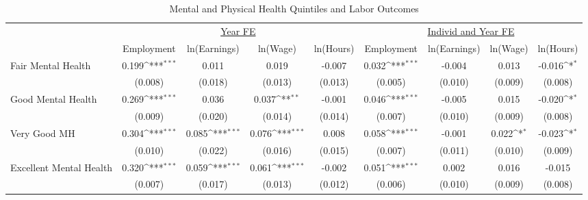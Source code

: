 \def\sym#1{\ifmmode^{#1}\else\(^{#1}\)\fi}
\begin{table}
\center\caption*{Mental and Physical Health Quintiles and Labor Outcomes}
\footnotesize
\begin{tabular}{l*{8}{c}}
                    &\multicolumn{4}{c}{\underline{Year FE}}                                                &\multicolumn{4}{c}{\underline{Individ and Year FE}}                                    \\\cmidrule(lr){2-5}\cmidrule(lr){6-9}
                    &\multicolumn{1}{c}{Employment}&\multicolumn{1}{c}{ln(Earnings)}&\multicolumn{1}{c}{ln(Wage)}&\multicolumn{1}{c}{ln(Hours)}&\multicolumn{1}{c}{Employment}&\multicolumn{1}{c}{ln(Earnings)}&\multicolumn{1}{c}{ln(Wage)}&\multicolumn{1}{c}{ln(Hours)}\\
\midrule
Fair Mental Health  &       0.199\sym{***}&       0.011         &       0.019         &      -0.007         &       0.032\sym{***}&      -0.004         &       0.013         &      -0.016\sym{*}  \\
                    &     (0.008)         &     (0.018)         &     (0.013)         &     (0.013)         &     (0.005)         &     (0.010)         &     (0.009)         &     (0.008)         \\
Good Mental Health  &       0.269\sym{***}&       0.036         &       0.037\sym{**} &      -0.001         &       0.046\sym{***}&      -0.005         &       0.015         &      -0.020\sym{*}  \\
                    &     (0.009)         &     (0.020)         &     (0.014)         &     (0.014)         &     (0.007)         &     (0.010)         &     (0.009)         &     (0.008)         \\
Very Good MH        &       0.304\sym{***}&       0.085\sym{***}&       0.076\sym{***}&       0.008         &       0.058\sym{***}&      -0.001         &       0.022\sym{*}  &      -0.023\sym{*}  \\
                    &     (0.010)         &     (0.022)         &     (0.016)         &     (0.015)         &     (0.007)         &     (0.011)         &     (0.010)         &     (0.009)         \\
Excellent Mental Health&       0.320\sym{***}&       0.059\sym{***}&       0.061\sym{***}&      -0.002         &       0.051\sym{***}&       0.002         &       0.016         &      -0.015         \\
                    &     (0.007)         &     (0.017)         &     (0.013)         &     (0.012)         &     (0.006)         &     (0.010)         &     (0.009)         &     (0.008)         \\

\end{tabular}
\end{table}
